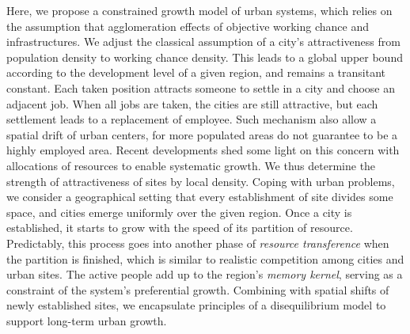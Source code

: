 \documentclass[reprint,unsortedaddress,amsmath,amssymb,aps,prl,showkeys]{revtex4-2}
\begin{document}
Here, we propose a constrained growth model of urban systems, which relies on the assumption that agglomeration effects of objective working chance and infrastructures. We adjust the classical assumption of a city's attractiveness from population density to working chance density. This leads to a global upper bound according to the development level of a given region, and remains a transitant constant. Each taken position attracts someone to settle in a city and choose an adjacent job. When all jobs are taken, the cities are still attractive, but each settlement leads to a replacement of employee. Such mechanism also allow a spatial drift of urban centers, for more populated areas do not guarantee to be a highly employed area. Recent developments shed some light on this concern with allocations of resources to enable systematic growth\cite{schaigorodsky2018short}. We thus determine the strength of attractiveness of sites by local density. Coping with urban problems, we consider a geographical setting that every establishment of site divides some space, and cities emerge uniformly over the given region. Once a city is established, it starts to grow with the speed of its partition of resource. Predictably, this process goes into another phase of \emph{resource transference} when the partition is finished, which is similar to realistic competition among cities and urban sites. The active people add up to the region's \emph{memory kernel}, serving as a constraint of the system's preferential growth\cite{PhysRevE.97.022132}. Combining with spatial shifts of newly established sites, we encapsulate principles of a disequilibrium model to support long-term urban growth. 
\end{document}
